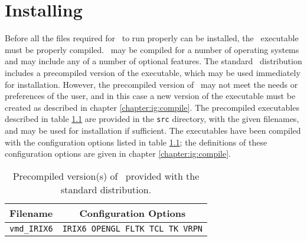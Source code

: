 
%
%
%

\chapter{Installing \VMD}
\label{chapter:ig:install}

Before all the files required for \VMD\ to run properly can be
installed, the \VMD\ executable must be properly compiled. \VMD\ may
be compiled for a number of operating systems and may include any of a
number of optional features.  The standard \VMD\ distribution includes
a precompiled version of the executable, which may be used immediately
for installation.  However, the precompiled version of \VMD\ may not
meet the needs or preferences of the user, and in this case a new
version of the executable must be created as described in chapter
\ref{chapter:ig:compile}.  The precompiled executables described in
table
\ref{table:ig:execs} are provided in the {\tt src} directory, with the
given filenames, and may be used for installation if sufficient.  The
executables have been compiled with the configuration options listed
in table \ref{table:ig:execs}; the definitions of these
configuration options are given in chapter \ref{chapter:ig:compile}.

\begin{table}[htb]
  \hspace{1.1in}
  \begin{tabular}{|l|l|} \hline
    Filename & \multicolumn{1}{|c|}{Configuration Options} \\ \hline\hline
    {\tt vmd\_IRIX6}	& {\tt IRIX6 OPENGL FLTK TCL TK VRPN} \\ \hline
  \end{tabular}
  \caption{Precompiled version(s) of \VMD\ provided with the standard distribution.}
  \label{table:ig:execs}
\end{table}

